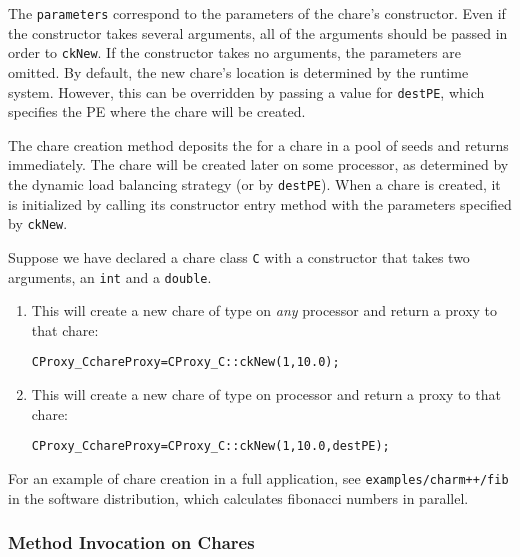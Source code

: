 The {\tt parameters} correspond to the parameters of the chare's constructor.
Even if the constructor takes several arguments, all of the arguments should be
passed in order to {\tt ckNew}. If the constructor takes no arguments, the
parameters are omitted. By default, the new chare's location is determined by
the runtime system. However, this can be overridden by passing a value for
{\tt destPE}, which specifies the PE where the chare will be created.

The chare creation method deposits the  for
a chare in a pool of seeds and returns immediately. The chare will
be created later on some processor, as determined by the dynamic load balancing strategy (or by {\tt destPE}).
When a chare is created, it is
initialized by calling its constructor entry method with the parameters specified by {\tt ckNew}.

Suppose we have declared a chare class {\tt C} with a constructor that takes two
arguments, an {\tt int} and a {\tt double}.

\begin{enumerate}
\item{This will create a new chare of type  on {\em any}
processor and return a proxy to that chare:}

\begin{alltt}
   CProxy_C chareProxy = CProxy_C::ckNew(1, 10.0);
\end{alltt} 

\item{This will create a new chare of type  on processor
 and return a proxy to that chare:}

\begin{alltt}
   CProxy_C chareProxy = CProxy_C::ckNew(1, 10.0, destPE);
\end{alltt}

\end{enumerate}

For an example of chare creation in a full application, see
{\tt examples/charm++/fib} in the \charmpp software distribution, which
calculates fibonacci numbers in parallel.

\subsubsection{Method Invocation on Chares}

